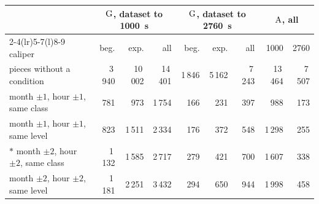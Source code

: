 \begin{tabular}{@{}l r r r r r r r r@{}}
\toprule
 & \multicolumn{3}{c}{$\mathrm{G}$, dataset to 1000~s} & \multicolumn{3}{c}{$\mathrm{G}$, dataset to 2760~s} & \multicolumn{2}{c}{$\mathrm{A}$, all} \\
\cmidrule(lr){2-4}\cmidrule(lr){5-7}\cmidrule(l){8-9}
caliper & beg. & exp. & all & beg. & exp. & all & 1000 & 2760 \\
\midrule
pieces without a condition & 3\,940 & 10\,002 & 14\,401 & 1\,846 & 5\,162 & 7\,243 & 13\,464 & 7\,507 \\
month $\pm1$, hour $\pm1$, same class & 781 & 973 & 1\,754 & 166 & 231 & 397 & 988 & 173 \\
month $\pm1$, hour $\pm1$, same level & 823 & 1\,511 & 2\,334 & 176 & 372 & 548 & 1\,298 & 255 \\
$\ast$ month $\pm2$, hour $\pm2$, same class & 1\,132 & 1\,585 & 2\,717 & 279 & 421 & 700 & 1\,607 & 338 \\
month $\pm2$, hour $\pm2$, same level & 1\,181 & 2\,251 & 3\,432 & 294 & 650 & 944 & 1\,998 & 458 \\
\bottomrule
\end{tabular}

